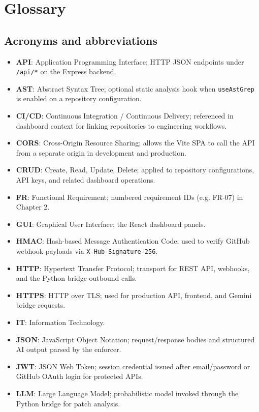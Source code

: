 \chapter*{Glossary}

\section*{Acronyms and abbreviations}
\begin{itemize}
\item \textbf{API}: Application Programming Interface; HTTP JSON endpoints under \texttt{/api/*} on the Express backend.
\item \textbf{AST}: Abstract Syntax Tree; optional static analysis hook when \texttt{useAstGrep} is enabled on a repository configuration.
\item \textbf{CI/CD}: Continuous Integration / Continuous Delivery; referenced in dashboard context for linking repositories to engineering workflows.
\item \textbf{CORS}: Cross-Origin Resource Sharing; allows the Vite SPA to call the API from a separate origin in development and production.
\item \textbf{CRUD}: Create, Read, Update, Delete; applied to repository configurations, API keys, and related dashboard operations.
\item \textbf{FR}: Functional Requirement; numbered requirement IDs (e.g. FR-07) in Chapter 2.
\item \textbf{GUI}: Graphical User Interface; the React dashboard panels.
\item \textbf{HMAC}: Hash-based Message Authentication Code; used to verify GitHub webhook payloads via \texttt{X-Hub-Signature-256}.
\item \textbf{HTTP}: Hypertext Transfer Protocol; transport for REST API, webhooks, and the Python bridge outbound calls.
\item \textbf{HTTPS}: HTTP over TLS; used for production API, frontend, and Gemini bridge requests.
\item \textbf{IT}: Information Technology.
\item \textbf{JSON}: JavaScript Object Notation; request/response bodies and structured AI output parsed by the enforcer.
\item \textbf{JWT}: JSON Web Token; session credential issued after email/password or GitHub OAuth login for protected APIs.
\item \textbf{LLM}: Large Language Model; probabilistic model invoked through the Python bridge for patch analysis.

\end{itemize}
